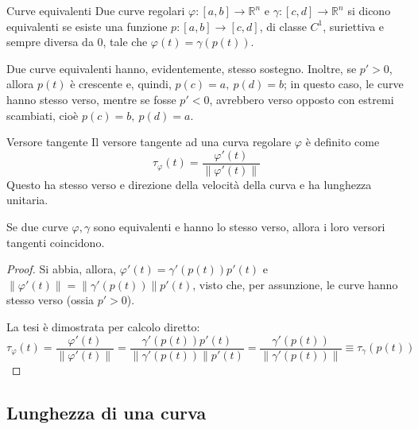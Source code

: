 \documentclass[11pt, a4paper]{scrartcl}
\theoremstyle{definition}
\numberwithin{esempio}{section}
\theoremstyle{definition}
\numberwithin{obs}{section}
\numberwithin{nota}{section}
\numberwithin{equation}{subsection}
\begin{document}
\begin{definizione}
	{Curve equivalenti}{}
	Due curve regolari $\varphi :\left[ a,b \right] \to \mathbb{R}^n $ e $\gamma: \left[ c,d \right] \to \mathbb{R}^n$ si dicono equivalenti se esiste una funzione $p:\left[ a,b \right] \to \left[ c,d \right] $, di classe $C^1$, suriettiva e sempre diversa da $0$, tale che $\varphi (t) = \gamma(p(t))$.
\end{definizione}
\noindent Due curve equivalenti hanno, evidentemente, stesso sostegno.
Inoltre, se $p'>0$, allora $p(t)$ \`e crescente e, quindi, $p(c) = a, \ p(d) = b$; in questo caso, le curve hanno stesso verso, mentre se fosse $p'<0$, avrebbero verso opposto con estremi scambiati, cio\`e $p(c) = b, \ p(d) = a$.
\begin{definizione}
	{Versore tangente}{}
	Il versore tangente ad una curva regolare $\varphi $ \`e definito come
	\[
	\tau _\varphi (t) = \frac{\varphi '(t)}{\left\lVert \varphi '(t) \right\rVert }
	\] 
Questo ha stesso verso e direzione della velocit\`a della curva e ha lunghezza unitaria.	
\end{definizione}
\begin{teorema}
	{}{}
	Se due curve $\varphi , \gamma$ sono equivalenti e hanno lo stesso verso, allora i loro versori tangenti coincidono.
	\begin{proof}
		Si abbia, allora, $\varphi '(t) = \gamma'(p(t)) p'(t)$ e $\left\lVert \varphi '(t) \right\rVert = \left\lVert \gamma'(p(t)) \right\rVert p'(t)$, visto che, per assunzione, le curve hanno stesso verso (ossia $p' > 0$).

		La tesi \`e dimostrata per calcolo diretto:
		\[
		\tau _\varphi  (t) = \frac{\varphi '(t) }{\left\lVert \varphi '(t) \right\rVert } = \frac{\gamma'(p(t)) p'(t)}{\left\lVert \gamma'(p(t)) \right\rVert p'(t)}=\frac{\gamma'(p(t))}{\left\lVert \gamma'(p(t)) \right\rVert }\equiv \tau _\gamma(p(t))
		\] 
	\end{proof}
\end{teorema}
\subsection{Lunghezza di una curva}
\end{document}

